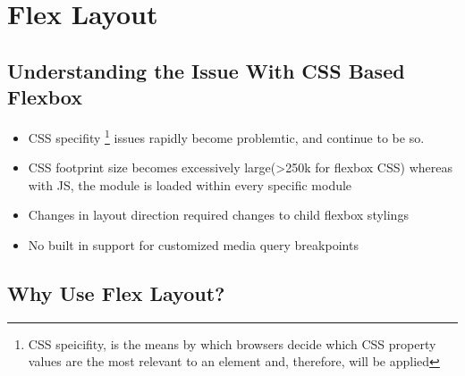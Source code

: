 \maketitle{}
\section{ Flex Layout }


\subsection{ Understanding the Issue With CSS Based Flexbox }
\begin{itemize}
  \item CSS specifity \footnote{CSS speicifity, is the means by which browsers
  decide which CSS property values are the most relevant to an element and,
  therefore, will be applied} issues rapidly become problemtic, and continue
  to be so.
  \item CSS footprint size becomes excessively large(>250k for flexbox CSS)
  whereas with JS, the module is loaded within every specific module
  \item Changes in layout direction required changes to child flexbox stylings
  \item No built in support for customized media query breakpoints 

\end{itemize}

\subsection{ Why Use Flex Layout? }
